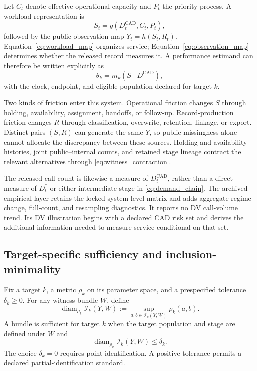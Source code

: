 \documentclass[11pt]{article}
\begin{document}
Let $C_t$ denote effective operational capacity and $P_t$ the priority process. A workload representation is
\begin{equation}
S_t=g(D_t^{\mathrm{CAD}},C_t,P_t),
\label{eq:workload_map}
\end{equation}
followed by the public observation map $Y_t=h(S_t,R_t)$. Equation~\eqref{eq:workload_map} organizes service; Equation~\eqref{eq:observation_map} determines whether the released record measures it. A performance estimand can therefore be written explicitly as
\begin{equation}
\theta_k=m_k\!\left(S\mid D^{\mathrm{CAD}}\right),
\label{eq:conditional_performance}
\end{equation}
with the clock, endpoint, and eligible population declared for target $k$.

Two kinds of friction enter this system. Operational friction changes $S$ through holding, availability, assignment, handoffs, or follow-up. Record-production friction changes $R$ through classification, overwrite, retention, linkage, or export. Distinct pairs $(S,R)$ can generate the same $Y$, so public missingness alone cannot allocate the discrepancy between these sources. Holding and availability histories, joint public--internal counts, and retained stage lineage contract the relevant alternatives through \cref{eq:witness_contraction}.

The released call count is likewise a measure of $D_t^{\mathrm{CAD}}$, rather than a direct measure of $D_t^*$ or either intermediate stage in \cref{eq:demand_chain}. The archived empirical layer retains the locked system-level matrix and adds aggregate regime-change, full-count, and resampling diagnostics. It reports no DV call-volume trend. Its DV illustration begins with a declared CAD risk set and derives the additional information needed to measure service conditional on that set.

\subsection{Target-specific sufficiency and inclusion-minimality}
\label{sec:witness_minimality}

Fix a target $k$, a metric $\rho_k$ on its parameter space, and a prespecified tolerance $\delta_k\ge 0$. For any witness bundle $W$, define
\begin{equation}
\operatorname{diam}_{\rho_k}\mathcal I_k(Y,W)
:=
\sup_{a,b\in\mathcal I_k(Y,W)}\rho_k(a,b).
\label{eq:identified_diameter}
\end{equation}
A bundle is sufficient for target $k$ when the target population and stage are defined under $W$ and
\begin{equation}
\operatorname{diam}_{\rho_k}\mathcal I_k(Y,W)\le\delta_k.
\label{eq:witness_sufficiency}
\end{equation}
The choice $\delta_k=0$ requires point identification. A positive tolerance permits a declared partial-identification standard.
\end{document}
